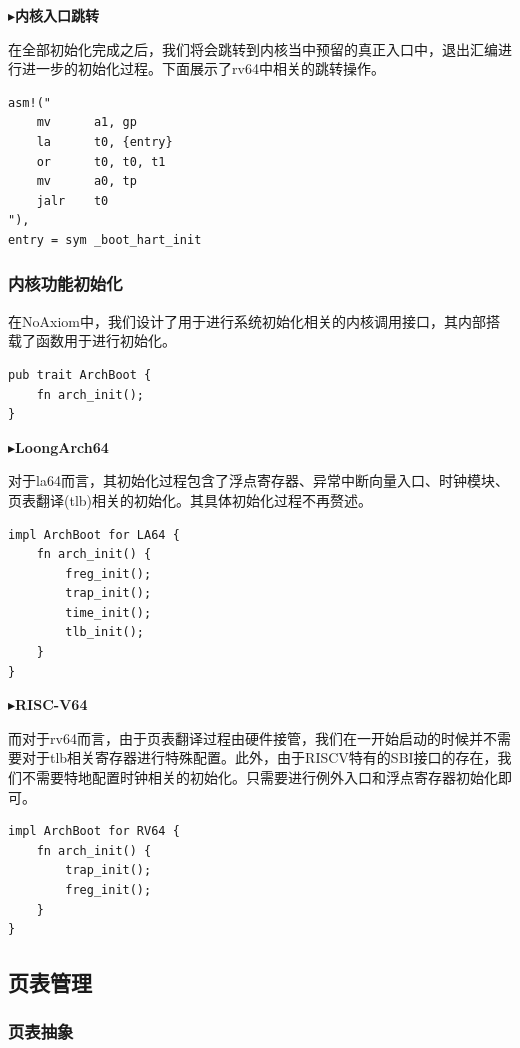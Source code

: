 \documentclass{article}
\begin{document}
$\blacktriangleright$\textbf{内核入口跳转}

在全部初始化完成之后，我们将会跳转到内核当中预留的真正入口中，退出汇编进行进一步的初始化过程。下面展示了rv64中相关的跳转操作。

\begin{lstlisting}
asm!("
    mv      a1, gp
    la      t0, {entry}
    or      t0, t0, t1
    mv      a0, tp
    jalr    t0
"),
entry = sym _boot_hart_init
\end{lstlisting}

\subsubsection{内核功能初始化}

在NoAxiom中，我们设计了用于进行系统初始化相关的内核调用接口，其内部搭载了函数用于进行初始化。

\begin{lstlisting}
pub trait ArchBoot {
    fn arch_init();
}
\end{lstlisting}

$\blacktriangleright$\textbf{LoongArch64}

对于la64而言，其初始化过程包含了浮点寄存器、异常中断向量入口、时钟模块、页表翻译(tlb)相关的初始化。其具体初始化过程不再赘述。

\begin{lstlisting}
impl ArchBoot for LA64 {
    fn arch_init() {
        freg_init();
        trap_init();
        time_init();
        tlb_init();
    }
}
\end{lstlisting}

$\blacktriangleright$\textbf{RISC-V64}

而对于rv64而言，由于页表翻译过程由硬件接管，我们在一开始启动的时候并不需要对于tlb相关寄存器进行特殊配置。此外，由于RISCV特有的SBI接口的存在，我们不需要特地配置时钟相关的初始化。只需要进行例外入口和浮点寄存器初始化即可。

\begin{lstlisting}
impl ArchBoot for RV64 {
    fn arch_init() {
        trap_init();
        freg_init();
    }
}
\end{lstlisting}

\subsection{页表管理}

\subsubsection{页表抽象}
\end{document}
